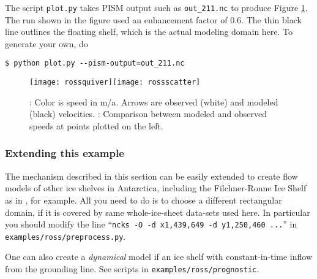 The script \texttt{plot.py} takes PISM output such as \texttt{out_211.nc} to produce Figure \ref{fig:rosspython}.  The run shown in the figure used an enhancement factor of $0.6$.  The thin black line outlines the floating shelf, which is the actual modeling domain here.  To generate your own, do

\begin{verbatim}
$ python plot.py --pism-output=out_211.nc
\end{verbatim}%

\begin{figure}[ht]
\centering
\mbox{\texttt{[image: rossquiver]}\quad \texttt{[image: rossscatter]}}
\caption{: Color is speed in m/a.  Arrows are observed (white) and modeled (black) velocities.  : Comparison between modeled and observed speeds at points plotted on the left.}
\label{fig:rosspython}
\end{figure}

\subsubsection*{Extending this example}

The mechanism described in this section can be easily extended to create flow models of other ice shelves in Antarctica, including the Filchner-Ronne Ice Shelf as in \cite{AlbrechtLevermann2012}, for example.  All you need to do is to choose a different rectangular domain, if it is covered by same whole-ice-sheet data-sets used here.  In particular you should modify the line ``\texttt{ncks -O -d x1,439,649 -d y1,250,460 ...}'' in \texttt{examples/ross/preprocess.py}.

One can also create a \emph{dynamical} model if an ice shelf with constant-in-time inflow from the grounding line. See scripts in \texttt{examples/ross/prognostic}.

